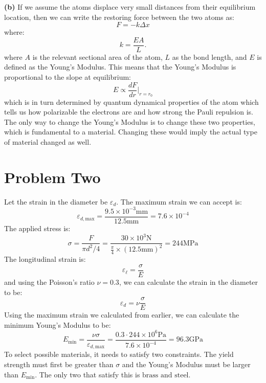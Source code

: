 \documentclass{article}
\begin{document}
    \noindent \textbf{(b)} If we assume the atoms displace very small distances from their equilibrium location, then we can write the restoring force between the two atoms as:
    \begin{equation}
        F = -k\Delta x
    \end{equation}
    where:
    \begin{equation}
        k = \frac{EA}{L}.
    \end{equation}
    where $A$ is the relevant sectional area of the atom, $L$ as the bond length, and $E$ is defined as the Young's Modulus. This means that the Young's Modulus is proportional to the slope at equilibrium:
    \begin{equation}
        E \propto \frac{dF}{dr}\Biggr|_{r=r_0}
    \end{equation}
    which is in turn determined by quantum dynamical properties of the atom which tells us how polarizable the electrons are and how strong the Pauli repulsion is. The only way to change the Young's Modulus is to change these two properties, which is fundamental to a material. Changing these would imply the actual type of material changed as well.
    \section*{Problem Two}
    Let the strain in the diameter be $\varepsilon_d$. The maximum strain we can accept is:
    \begin{equation}
        \varepsilon_{d,\text{max}} = \frac{9.5 \times 10^{-3}\si{\milli\meter}}{12.5\si{\milli\meter}} = 7.6\times 10^{-4}
    \end{equation}
    The applied stress is:
    \begin{equation}
        \sigma = \frac{F}{\pi d^2/4} = \frac{30 \times 10^3 \si{\newton}}{\frac{\pi}{4}\times (12.5 \si{\milli\meter})^2} = 244\si{\mega\pascal}
    \end{equation}
    The longitudinal strain is:
    \begin{equation}
        \varepsilon_{\ell} = \frac{\sigma}{E}
    \end{equation}
    and using the Poisson's ratio $\nu = 0.3$, we can calculate the strain in the diameter to be:
    \begin{equation}
        \varepsilon_d = \nu \frac{\sigma}{E}
    \end{equation}
    Using the maximum strain we calculated from earlier, we can calculate the minimum Young's Modulus to be:
    \begin{equation}
        E_\text{min} = \frac{\nu \sigma}{\varepsilon_{d,\text{max}}} = \frac{0.3 \cdot 244 \times 10^6 \si{\pascal}}{7.6 \times 10^{-4}} = 96.3 \si{\giga\pascal}
    \end{equation}
    To select possible materials, it needs to satisfy two constraints. The yield strength must first be greater than $\sigma$ and the Young's Modulus must be larger than $E_\text{min}$. The only two that satisfy this is $\boxed{\text{brass and steel}}$.
\end{document}
